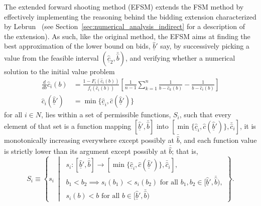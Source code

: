 The extended forward shooting method (EFSM) extends the FSM method by effectively implementing the reasoning behind the bidding extension characterized by Lebrun~\cite{Lebrun2006} (see Section~\ref{sec:numerical_analysis_indirect} for a description of the extension). As such, like the original method, the EFSM aims at finding the best approximation of the lower bound on bids, $\underline{\hat{b}}'$ say, by successively picking a value from the feasible interval $(\underline{\hat{c}}_2,\bar{\hat{b}})$, and verifying whether a numerical solution to the initial value problem
\begin{equation}
  \label{eq:efsm_initial_value_problem_indirect}
  \begin{array}{ll}
    \displaystyle\frac{d}{db}\hat{c}_i(b) &= \displaystyle\frac{1 - F_i(\hat{c}_i(b))}{f_i(\hat{c}_i(b))}\left[ \frac{1}{n-1}\sum_{k=1}^n\frac{1}{b - \hat{c}_k(b)} - \frac{1}{b - \hat{c}_i(b)} \right] \\[2ex]
    \hat{c}_i(\underline{\hat{b}}') &= \min\{\underline{\hat{c}}_i, \hat{c}(\underline{\hat{b}}')\}
  \end{array}
\end{equation}
for all $i\in N$, lies within a set of permissible functions, $S_i$, such that every element of that set is a function mapping $[\underline{\hat{b}}',\bar{\hat{b}}]$ into $[\min\{\underline{\hat{c}}_i, \hat{c}(\underline{\hat{b}}')\}, \bar{\hat{c}}_i]$, it is monotonically increasing everywhere except possibly at $\bar{\hat{b}}$, and each function value is strictly lower than its argument except possibly at $\bar{\hat{b}}$; that is,
\begin{equation*}
  S_i\equiv\left\{s_i \:\middle\vert\:
  \begin{array}{l}
    s_i: [\underline{\hat{b}}', \bar{\hat{b}}]\to [\min\{\underline{\hat{c}}_i, \hat{c}(\underline{\hat{b}}')\}, \bar{\hat{c}}_i],\\
    b_1 < b_2\implies s_i(b_1) < s_i(b_2) \text{ for all }b_1,b_2\in [\underline{\hat{b}}', \bar{\hat{b}}),\\
    s_i(b) < b \text{ for all }b\in [\underline{\hat{b}}', \bar{\hat{b}})
  \end{array}
  \right\}.
\end{equation*}


